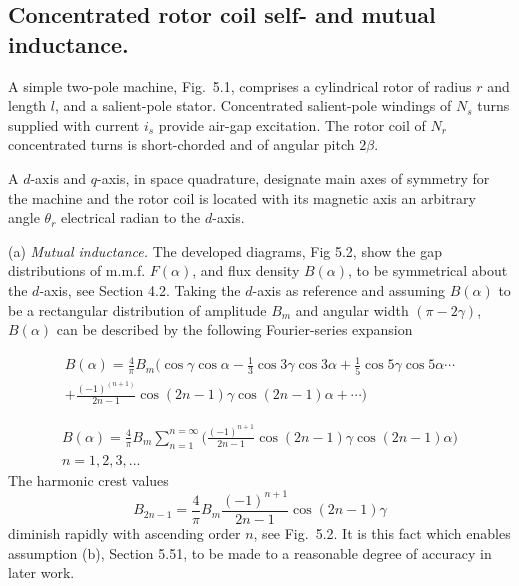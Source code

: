 \documentclass[a4paper,numbers=noenddot,12pt]{scrbook}
\begin{document}
        \subsection{Concentrated rotor coil self- and mutual inductance.}
        A simple two-pole machine, Fig.\ 5.1, comprises a cylindrical rotor of radius $r$ and length $l$, and a salient-pole stator. Concentrated salient-pole windings of $N_s$ turns supplied with current $i_s$ provide air-gap excitation. The rotor coil of $N_r$ concentrated turns is short-chorded and of angular pitch $2\beta$.

        A $d$-axis and $q$-axis, in space quadrature, designate main axes of symmetry for the machine and the rotor coil is located with its magnetic axis an arbitrary angle $\theta_r$ electrical radian to the $d$-axis.

        \noindent (a) \textit{Mutual inductance.} The developed diagrams, Fig 5.2, show the gap distributions of m.m.f. $F(\alpha)$, and flux density $B(\alpha)$, to be symmetrical about the $d$-axis, see Section 4.2. Taking the $d$-axis as reference and assuming $B(\alpha)$ to be a rectangular distribution of amplitude $B_m$ and angular width $(\pi-2\gamma)$, $B(\alpha)$ can be described by the following Fourier-series expansion

        \begin{multline}
            B(\alpha)=\frac{4}{\pi}B_m(\cos \gamma \cos \alpha-\frac{1}{3}\cos 3\gamma \cos 3\alpha+\frac{1}{5}\cos 5\gamma \cos 5\alpha \cdots \\ + \frac{{(-1)}^{(n+1)}}{2n-1}\cos(2n-1)\gamma \cos(2n-1)\alpha+\cdots)
            \label{eq:Ecu1}
        \end{multline}

        \begin{multline}
            B{(\alpha)} = \frac{4}{\pi} B_m \displaystyle \sum_{n=1}^{n=\infty} \bigg( \frac{{(-1)}^{n+1}}{2n-1} \cos(2n-1)\gamma \cos(2n-1)\alpha \bigg) \\ n=1,2,3,\ldots
        \end{multline}
        The harmonic crest values
        \begin{equation}
            B_{2n-1} = \frac{4}{\pi} B_m \frac{{(-1)}^{n+1}}{2n-1} \cos(2n-1)\gamma
        \end{equation}
        diminish rapidly with ascending order $n$, see Fig.\ 5.2. It is this fact which enables assumption (b), Section 5.51, to be made to a reasonable degree of accuracy in later work.
\end{document}
